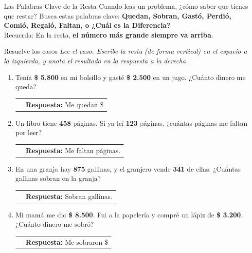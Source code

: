 \documentclass[12pt, letterpaper]{article}
\newcommand{\boxfill}[1][1.2cm]{\tcbox[on line, size=minimal, colframe=valdark!80, colback=white, boxrule=0.5pt, arc=1mm, boxsep=2pt, left=2pt, right=2pt, top=2pt, bottom=2pt]{\makebox[#1]{\vphantom{M}}}}
\begin{document}
	\begin{truco}{Las Palabras Clave de la Resta}
		Cuando leas un problema, ¿cómo saber que tienes que restar? Busca estas palabras clave: \textbf{Quedan, Sobran, Gastó, Perdió, Comió, Regaló, Faltan, o ¿Cuál es la Diferencia?}
		\\[0.2cm]
		Recuerda: En la resta, \textbf{el número más grande siempre va arriba}.
	\end{truco}
	\newpage
	\begin{practica}{Resuelve los casos}
		\textit{Lee el caso. Escribe la resta (de forma vertical) en el espacio a la izquierda, y anota el resultado en la respuesta a la derecha.}
		
		\vspace{0.4cm}
		\begin{enumerate}[itemsep=1.5cm]
			\item Tenía \textbf{\$ 5.800} en mi bolsillo y gasté \textbf{\$ 2.500} en un jugo. ¿Cuánto dinero me queda? \\
			\begin{tabular}{c c}
				\makebox[5cm]{ \boxfill[3cm] } & \textbf{Respuesta:} Me quedan \$ \boxfill[1.5cm]
			\end{tabular}
			
			\item Un libro tiene \textbf{458} páginas. Si ya leí \textbf{123} páginas, ¿cuántas páginas me faltan por leer? \\
			\begin{tabular}{c c}
				\makebox[5cm]{ \boxfill[3cm] } & \textbf{Respuesta:} Me faltan \boxfill[1.5cm] páginas.
			\end{tabular}
			
			\item En una granja hay \textbf{875} gallinas, y el granjero vende \textbf{341} de ellas. ¿Cuántas gallinas sobran en la granja? \\
			\begin{tabular}{c c}
				\makebox[5cm]{ \boxfill[3cm] } & \textbf{Respuesta:} Sobran \boxfill[1.5cm] gallinas.
			\end{tabular}
			
			\item Mi mamá me dio \textbf{\$ 8.500}. Fui a la papelería y compré un lápiz de \textbf{\$ 3.200}. ¿Cuánto dinero me sobró? \\
			\begin{tabular}{c c}
				\makebox[5cm]{ \boxfill[3cm] } & \textbf{Respuesta:} Me sobraron \$ \boxfill[1.5cm]
			\end{tabular}
			

\end{enumerate}
\end{practica}
\end{document}
